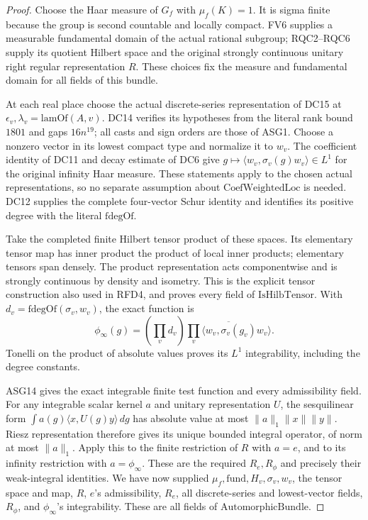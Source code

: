 \begin{proof}
Choose the Haar measure of \(G_f\) with \(\mu_f(K)=1\).
It is sigma finite because the group is second countable and locally
compact.  FV6 supplies a measurable fundamental domain of the actual
rational subgroup; RQC2--RQC6 supply its quotient Hilbert space and
the original strongly continuous unitary right regular representation
\(R\).  These choices fix the measure and fundamental domain for
all fields of this bundle.

At each real place choose the actual discrete-series representation of
DC15 at \(\epsilon_v,\lambda_v=\mathrm{lamOf}(A,v)\).
DC14 verifies its hypotheses from the literal rank bound \(1801\)
and gaps \(16n^{19}\); all casts and sign orders are those of
ASG1.  Choose a nonzero vector in its lowest compact type and normalize
it to \(w_v\).  The coefficient identity of DC11 and decay estimate
of DC6 give
\(g\mapsto\langle w_v,\sigma_v(g)w_v\rangle\in L^1\)
for the original infinity Haar measure.  These statements apply to the
chosen actual representations, so no separate assumption about
\(\mathrm{CoefWeightedLoc}\) is needed.  DC12 supplies the complete
four-vector Schur identity and identifies its positive degree with the
literal \(\mathrm{fdegOf}\).

Take the completed finite Hilbert tensor product of these spaces.
Its elementary tensor map has inner product the product of local inner
products; elementary tensors span densely.  The product representation
acts componentwise and is strongly continuous by density and isometry.
This is the explicit tensor construction also used in RFD4, and proves
every field of \(\mathrm{IsHilbTensor}\).
With \(d_v=\mathrm{fdegOf}(\sigma_v,w_v)\), the exact function is
\[
 \phi_\infty(g)=\left(\prod_v d_v\right)
            \overline{\prod_v\langle w_v,\sigma_v(g_v)w_v\rangle}.
\tag{ASG.13}
\]
Tonelli on the product of absolute values proves its \(L^1\)
integrability, including the degree constants.

ASG14 gives the exact integrable finite test function and every
admissibility field.  For any integrable scalar kernel \(a\) and
unitary representation \(U\), the sesquilinear form
\(\int a(g)\langle x,U(g)y\rangle\,dg\) has absolute value
at most \(\|a\|_1\|x\|\|y\|\).  Riesz representation
therefore gives its unique bounded integral operator, of norm at most
\(\|a\|_1\).  Apply this to the finite restriction of \(R\)
with \(a=e\), and to its infinity restriction with
\(a=\phi_\infty\).  These are the required \(R_e,R_\phi\)
and precisely their weak-integral identities.
We have now supplied \(\mu_f,\mathrm{fund},H_v,\sigma_v,w_v\),
the tensor space and map, \(R\), \(e\)'s admissibility,
\(R_e\), all discrete-series and lowest-vector fields,
\(R_\phi\), and \(\phi_\infty\)'s integrability.
These are all fields of \(\mathrm{AutomorphicBundle}\).
\end{proof}

